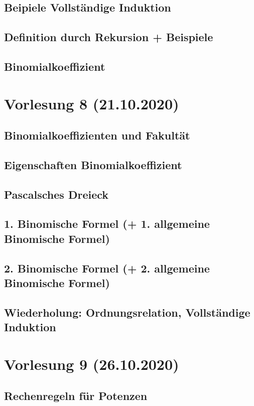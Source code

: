 \documentclass[]{article}
\begin{document}
\subsection{Beipiele Vollständige Induktion}
\subsection{Definition durch Rekursion + Beispiele}
\subsection{Binomialkoeffizient}


\section{Vorlesung 8 (21.10.2020)}
\subsection{Binomialkoeffizienten und Fakultät}
\subsection{Eigenschaften Binomialkoeffizient}
\subsection{Pascalsches Dreieck}
\subsection{1. Binomische Formel (+ 1. allgemeine Binomische Formel)}
\subsection{2. Binomische Formel (+ 2. allgemeine Binomische Formel)}
\subsection{Wiederholung: Ordnungsrelation, Vollständige Induktion}


\section{Vorlesung 9 (26.10.2020)}
\subsection{Rechenregeln für Potenzen}
\end{document}
